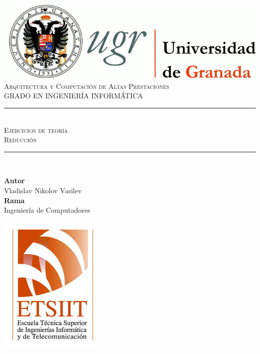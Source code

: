 \documentclass[11pt,a4paper]{article}
\newcommand{\asignatura}{Arquitectura y Computación de Altas Prestaciones}
\newcommand{\autor}{Vladislav Nikolov Vasilev}
\newcommand{\titulo}{Ejercicios de teoría}
\newcommand{\subtitulo}{Reducción}
\newcommand{\rama}{Ingeniería de Computadores}
\begin{document}

\begin{titlepage}

\begin{minipage}{\textwidth}

\centering

\includegraphics[scale=0.3]{img/logo_ugr.jpg}\\[1cm]

\textsc{\Large \asignatura{}\\[0.2cm]}
\textsc{GRADO EN INGENIERÍA INFORMÁTICA}\\[1cm]

\noindent\rule[-1ex]{\textwidth}{1pt}\\[1.5ex]
\textsc{{\Huge \titulo\\[0.5ex]}}
\textsc{{\Large \subtitulo\\}}
\noindent\rule[-1ex]{\textwidth}{2pt}\\[3.5ex]

\end{minipage}

\vspace{0.7cm}

\begin{minipage}{\textwidth}

\centering

\textbf{Autor}\\ {\autor{}}\\[2.5ex]
\textbf{Rama}\\ {\rama}\\[2.5ex]
\vspace{0.3cm}

\includegraphics[scale=0.3]{img/etsiit.jpeg}


\end{minipage}
\end{titlepage}
\end{document}
